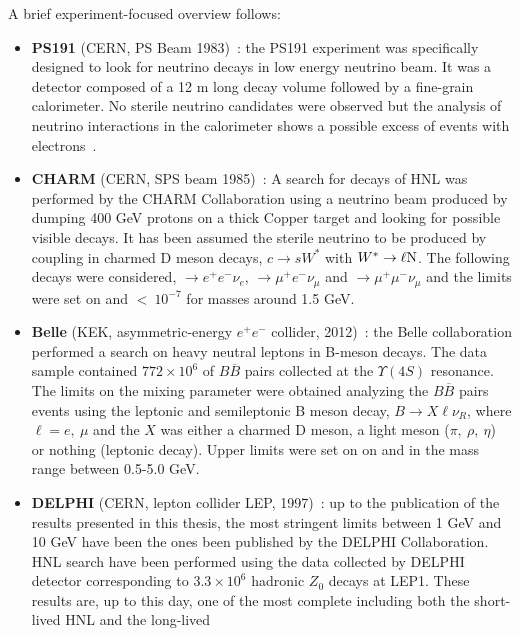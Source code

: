 A brief experiment-focused overview follows:
\begin{itemize}
\item \textbf{PS191} (CERN, PS Beam 1983)~\cite{BERNARDI1988332}: the PS191
  experiment was specifically designed to look for neutrino decays in
  low energy neutrino beam. It was a detector composed of a 12 m long
  decay volume followed by a fine-grain calorimeter. No sterile
  neutrino candidates were observed but the analysis of neutrino
  interactions in the calorimeter shows a possible excess of events
  with electrons~\cite{Vannucci:1985vs}.
\item \textbf{CHARM} (CERN, SPS beam 1985)~\cite{DORENBOSCH1986473}: A search
  for decays of HNL was performed by the CHARM Collaboration using a
  neutrino beam produced by dumping 400 GeV protons on a thick Copper
  target and looking for possible visible decays. It has been assumed
  the sterile neutrino to be produced by coupling in charmed D meson
  decays, \ie $c\rightarrow s W^{*}$ with $W^{*} \rightarrow \ell \mathrm{N}$. The following decays were considered, \hnl $\rightarrow
  e^+e^-\nu_e$, $\rightarrow \mu^+e^-\nu_\mu$ and $\rightarrow
  \mu^+\mu^-\nu_\mu$ and the limits were set on \mixpare and
  \mixparm $< \:10^{-7}$ for \hnl masses around 1.5 GeV. 
\item \textbf{Belle} (KEK, asymmetric-energy $e^+e^-$ collider, 2012)~\cite{Liventsev_2013}: the Belle collaboration
  performed a search on heavy neutral leptons in B-meson
  decays. The data sample contained $772\times 10^6$ of $B\overline{B}$
  pairs collected at the $\Upsilon(4S)$ resonance. The limits
  on the mixing parameter were obtained analyzing the $B\overline{B}$ pairs
  events using the leptonic and semileptonic B meson decay,
  $B\rightarrow X\ell\nu_R$, where $\ell = e, \: \mu$ and the $X$ was
  either a charmed D meson, a light meson ($\pi, \: \rho, \: \eta$) or
  nothing (leptonic decay). Upper limits were set on on \mixpare and
  \mixparm in the mass range between 0.5-5.0 GeV. 
\item \textbf{DELPHI} (CERN, lepton collider LEP, 1997)~\cite{Abreu:1996pa}:
  up to the publication of the results presented in this thesis, the most stringent limits between 1 GeV and 10 GeV have been the ones
  been published by the DELPHI Collaboration. HNL search have been performed
  using the data collected by DELPHI detector corresponding to $3.3
  \times 10^6$ hadronic $Z_0$ decays at LEP1. These results are, up to
  this day, one of the most complete including both the short-lived HNL and the long-lived

\end{itemize}
